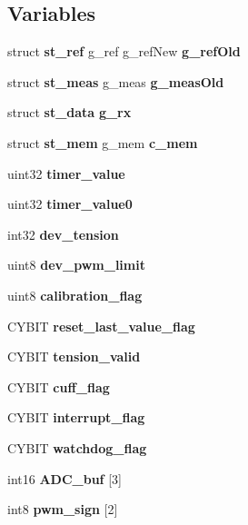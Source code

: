 \subsection*{Variables}
\begin{DoxyCompactItemize}
\item 
\mbox{\label{globals_8c_a158d26b6d15050b37d8039881d75e0dc}} 
struct \textbf{ st\+\_\+ref} g\+\_\+ref g\+\_\+ref\+New {\bfseries g\+\_\+ref\+Old}
\item 
\mbox{\label{globals_8c_a47c3980e6bddec492ca4315e36602ba0}} 
struct \textbf{ st\+\_\+meas} g\+\_\+meas {\bfseries g\+\_\+meas\+Old}
\item 
\mbox{\label{globals_8c_aa963ce8fafc11e104eb7ee22982d0345}} 
struct \textbf{ st\+\_\+data} {\bfseries g\+\_\+rx}
\item 
\mbox{\label{globals_8c_a44c3cbd8e234e0816f0334e29646a800}} 
struct \textbf{ st\+\_\+mem} g\+\_\+mem {\bfseries c\+\_\+mem}
\item 
\mbox{\label{globals_8c_ad47cd0e4d0fcf5739a88e52e949a8084}} 
uint32 {\bfseries timer\+\_\+value}
\item 
\mbox{\label{globals_8c_a9bab7f1b1cf2ba38d5968eee42644c32}} 
uint32 {\bfseries timer\+\_\+value0}
\item 
\mbox{\label{globals_8c_a53a494e9edc739a4f7c884778d1a93b1}} 
int32 {\bfseries dev\+\_\+tension}
\item 
\mbox{\label{globals_8c_a21f4f67e4203dea0b9956589eaa6cef3}} 
uint8 {\bfseries dev\+\_\+pwm\+\_\+limit}
\item 
\mbox{\label{globals_8c_afa36d7a54495dfdb796684539bf041a5}} 
uint8 {\bfseries calibration\+\_\+flag}
\item 
\mbox{\label{globals_8c_aa89a782cfe75ce7970236babd308fe69}} 
C\+Y\+B\+IT {\bfseries reset\+\_\+last\+\_\+value\+\_\+flag}
\item 
\mbox{\label{globals_8c_ac42fa606610c2600210d9b7b2c1d0882}} 
C\+Y\+B\+IT {\bfseries tension\+\_\+valid}
\item 
\mbox{\label{globals_8c_aa5f34e5d7cb5b1196d8e8ace4beb508e}} 
C\+Y\+B\+IT {\bfseries cuff\+\_\+flag}
\item 
\mbox{\label{globals_8c_a1e6fda88dfdabc63859f8907eb702920}} 
C\+Y\+B\+IT {\bfseries interrupt\+\_\+flag}
\item 
\mbox{\label{globals_8c_a156a860c465529ff2f515725ab816a58}} 
C\+Y\+B\+IT {\bfseries watchdog\+\_\+flag}
\item 
\mbox{\label{globals_8c_aed6b2ae513eb1fdb1dcfb2e8191dbfdd}} 
int16 {\bfseries A\+D\+C\+\_\+buf} [3]
\item 
\mbox{\label{globals_8c_a581fe1be8b8832dd9b5bc74d6cd8cfbd}} 
int8 {\bfseries pwm\+\_\+sign} [2]
\end{DoxyCompactItemize}


